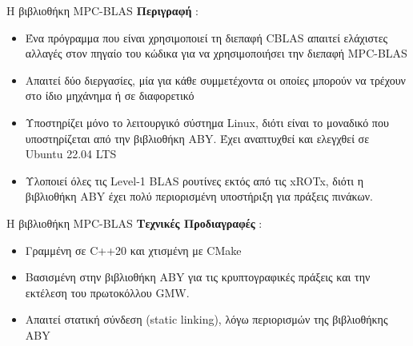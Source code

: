 \documentclass[10pt]{beamer}
\begin{document}
    \begin{frame}{Η βιβλιοθήκη MPC-BLAS}
        \textbf{Περιγραφή} :
        \begin{itemize}
            \item Ένα πρόγραμμα που είναι χρησιμοποιεί τη διεπαφή CBLAS απαιτεί ελάχιστες αλλαγές στον πηγαίο του κώδικα για να χρησιμοποιήσει την διεπαφή MPC-BLAS
            \item Απαιτεί δύο διεργασίες, μία για κάθε συμμετέχοντα οι οποίες μπορούν να τρέχουν στο ίδιο μηχάνημα ή σε διαφορετικό
            \item Υποστηρίζει μόνο το λειτουργικό σύστημα Linux, διότι είναι το μοναδικό που υποστηρίζεται από την βιβλιοθήκη ABY. Έχει αναπτυχθεί και ελεγχθεί σε Ubuntu 22.04 LTS
            \item Υλοποιεί όλες τις Level-1 BLAS ρουτίνες εκτός από τις xROTx, διότι η βιβλιοθήκη ABY έχει πολύ περιορισμένη υποστήριξη για πράξεις πινάκων.
        \end{itemize}
    \end{frame}

    \begin{frame}{Η βιβλιοθήκη MPC-BLAS}
        \textbf{Τεχνικές Προδιαγραφές} :
        \begin{itemize}
            \item Γραμμένη σε C++20 και χτισμένη με CMake
            \item Βασισμένη στην βιβλιοθήκη ABY για τις κρυπτογραφικές πράξεις και την εκτέλεση του πρωτοκόλλου GMW.
            \item Απαιτεί στατική σύνδεση (static linking), λόγω περιορισμών της βιβλιοθήκης ABY
        \end{itemize}
    \end{frame}
\end{document}
